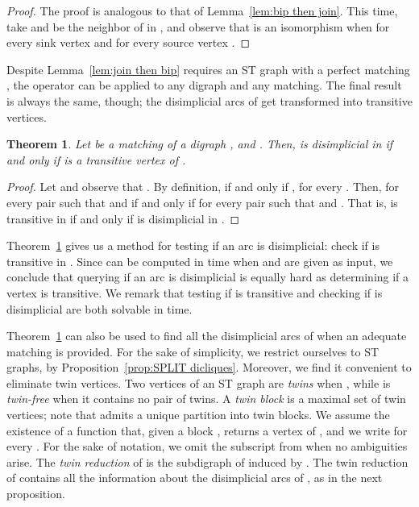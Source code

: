 \documentclass[a4paper,11pt]{article}
\newtheorem{theorem}{Theorem}
\begin{document}
\begin{proof}
  The proof is analogous to that of Lemma~\ref{lem:bip then join}.  This time, take  and  be the neighbor of  in , and observe that  is an isomorphism when  for every sink vertex  and  for every source vertex .
\end{proof}

Despite Lemma~\ref{lem:join then bip} requires an ST graph  with a perfect matching , the  operator can be applied to any digraph and any matching.  The final result is always the same, though; the disimplicial arcs of  get transformed into transitive vertices.

\begin{theorem}\label{thm:disimplicial is transitive}
  Let  be a matching of a digraph , and .  Then,  is disimplicial in  if and only if  is a transitive vertex of\/ .
\end{theorem}

\begin{proof}
  Let  and observe that .  By definition,  if and only if , for every .  Then,  for every pair  such that  and  if and only if  for every pair  such that  and .  That is,  is transitive in  if and only if  is disimplicial in .
\end{proof}

Theorem~\ref{thm:disimplicial is transitive} gives us a method for testing if an arc  is disimplicial: check if  is transitive in .  Since  can be computed in  time when  and  are given as input, we conclude that querying if an arc is disimplicial is equally hard as determining if a vertex is transitive.  We remark that testing if  is transitive and checking if  is disimplicial are both solvable in  time.

Theorem~\ref{thm:disimplicial is transitive} can also be used to find all the disimplicial arcs of  when an adequate matching is provided.  For the sake of simplicity, we restrict ourselves to ST graphs, by Proposition~\ref{prop:SPLIT dicliques}.  Moreover, we find it convenient to eliminate twin vertices.  Two vertices  of an ST graph  are \emph{twins} when , while  is \emph{twin-free} when it contains no pair of twins.  A \emph{twin block} is a maximal set of twin vertices; note that  admits a unique partition into twin blocks.  We assume the existence of a function  that, given a block , returns a vertex of , and we write  for every .  For the sake of notation, we omit the subscript  from  when no ambiguities arise.  The \emph{twin reduction} of  is the subdigraph  of  induced by .  The twin reduction of  contains all the information about the disimplicial arcs of , as in the next proposition.
\end{document}
